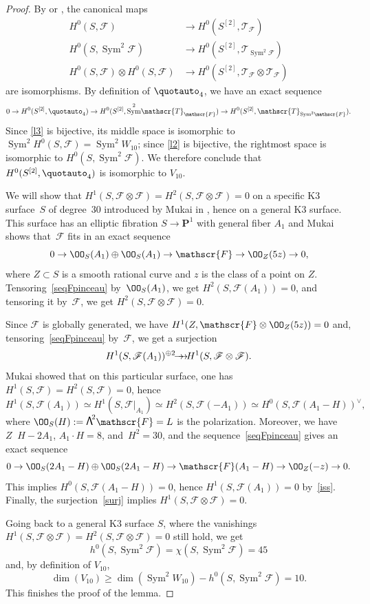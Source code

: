 \documentclass[JEP,XML,SOM,Unicode, NoEqCountersInSection,NoFloatCountersInSection]{cedram}
\let\mathcal\mathscr
\newcommand{\onto}{\mathchoice{\to\hspace*{-5mm}\to}{\to\hspace*{-2.85mm}\to}{\to\hspace*{-3mm}\to}{\to\hspace*{-3mm}\to}}
\theoremstyle{definition}
\renewcommand\P{{\mathbf P}}\let\PP\P
\newcommand\cF{\mathcal{F}}
\newcommand\cT{\mathcal{T}}
\let\isom\simeq
\DeclareMathOperator{\lin}{\underset{\mathrm lin}{\sim}}
\DeclareMathOperator{\Sym}{Sym}
\newcommand\bw[1]{{\hbox{\large$\mathsf{\Lambda}$}^{\!#1}}}
\newcommand\Tauto[1]{\cT_{#1}}
\newcommand\hilbS{S^{[2]}}
\begin{document}
\begin{proof}
By \cite[Th.\,1]{dan2} or \cite[Th.\,6.6]{krug}, the canonical maps
\begin{align}
H^0(S,\cF)& \to H^0(\hilbS, \Tauto{\cF})\nonumber \\
H^0(S,\Sym^2\! \cF) &\to H^0(\hilbS,\Tauto{\Sym^2 \!\cF})\label{l2}\\
H^0(S,\cF) \otimes H^0(S,\cF)& \to H^0(\hilbS, \Tauto{\cF}\otimes \Tauto{\cF}) \label{l3}
\end{align}
are isomorphisms. By definition of $\quotauto_4$, we have an exact sequence
\[
0\to H^0(\hilbS,\quotauto_4)\to
H^0(\hilbS,\Sym^2\! \Tauto{\cF})\to H^0(\hilbS,\Tauto{\Sym^2\!\cF}).
\]
Since \eqref{l3} is bijective, its middle space is isomorphic to $ \Sym^2\! H^0(S,\cF)=\Sym^2\!W_{10} $; since \eqref{l2} is bijective, the rightmost space is isomorphic to $H^0(S,\Sym^2\!\cF )$. We therefore conclude
that $H^0(\hilbS, \quotauto_4) $ is isomorphic to $ V_{10} $.

We will show
that $H^1(S,\cF\otimes \cF) =H^2(S,\cF\otimes \cF) = 0 $ on a specific K3 surface~$S$ of degree~$30$ introduced by Mukai in \cite[\S6]{mukai2}, hence on a general K3 surface. This surface has an elliptic fibration $S\to\P^1$ with general fiber $A_1$
and Mukai shows that~$\cF$
fits in an exact sequence
\begin{equation}
\label{seqFpinceau}
0 \to \OO_S(A_1) \oplus \OO_S(A_1) \to \cF \to \OO_Z(5z) \to 0,
\end{equation}
where $Z\subset S$ is a smooth rational curve {and $z$ is the class of a point
on $Z$}. Tensoring~\eqref{seqFpinceau} by~$\OO_S(A_1)$, we get $H^2(S,\cF(A_1))=0$, and tensoring it by~$\cF$, we get $H^2(S,\cF\otimes \cF) =0$.

Since $\cF$ is globally generated, we have $H^1(Z,\cF\otimes \OO_Z(5z))=0$ and, tensoring~\eqref{seqFpinceau} by~$\cF$, we get a surjection
\begin{equation}
\label{surj}
H^1(S,\cF(A_1))^{\oplus 2}\onto H^1(S,\cF\otimes \cF).
\end{equation}
Mukai showed that on this particular surface, one has $H^1(S,\cF)=H^2(S,\cF)=0$, hence
\begin{equation}
\label{iss}
H^1(S,\cF(A_1))\isom H^1(S,\cF\vert_{A_1})\isom H^2(S,\cF(-A_1))\isom H^0(S,\cF(A_1-H))^\vee,
\end{equation}
where $\OO_S(H) := \bw2\cF=L$ is the polarization. Moreover, we have $Z\lin H-2A_1$, $A_1 \cdot H =
8$, and~$H^2=30$, and the sequence~\eqref{seqFpinceau} gives an exact sequence
\[
0 \to \OO_S(2A_1-H) \oplus \OO_S(2A_1-H) \to \cF(A_1-H) \to \OO_Z(-z) \to 0.
\]
This implies $H^0(S,\cF(A_1-H))=0$, hence $ H^1(S,\cF(A_1))=0$ by~\eqref{iss}. Finally, the surjection~\eqref{surj} implies
$H^1(S,\cF\otimes \cF) =0$.

Going back to a general K3 surface $S$, where the vanishings $H^1(S,\cF\otimes \cF) =H^2(S,\cF\otimes \cF) =0$ still hold, we get
\[
h^0(S,\Sym^2\!\cF)= \chi(S,\Sym^2\!\cF)= 45
\] and, by definition of $V_{10}$,
\[
\dim (V_{10}) \ge\dim(\Sym^2\!W_{10})
-h^0(S,\Sym^2\!\cF)=10.
\]
This finishes the proof of the lemma.
\end{proof}
\end{document}
